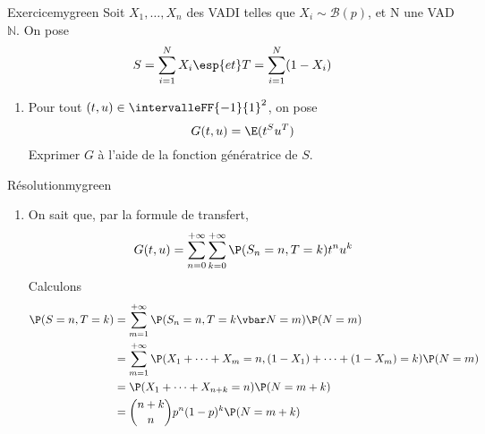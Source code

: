    \begin{omed}{Exercice}{mygreen}
        Soit $X_1,\ldots,X_n$ des VADI telles que $X_i \sim \mathcal{B}(p)$, et N une VAD$\mathbb{N}$. On pose 
        \[ S = \sum_{i=1}^{N} X_i \esp{et} T = \sum_{i=1}^{N} (1 - X_i) \]   
        \begin{enumerate}[label = (\alph*)]
            \item Pour tout $(t,u) \in \intervalleFF{-1}{1}^2$, on pose 
            \[ G(t,u) = \E(t^S u^T) \]   
            Exprimer $G$ à l’aide de la fonction génératrice de $S$.
        \end{enumerate}
    \end{omed}

    \begin{demo}{Résolution}{mygreen}
        \begin{enumerate}[label = (\alph*)]
            \item On sait que, par la formule de transfert, 
            \[ G(t,u) = \sum_{n=0}^{+\infty} \sum_{k=0}^{+\infty} \P(S_n = n, T = k) t^n u^k \]   
            Calculons
            \begin{align*}
                \P(S = n, T = k) 
                &= \sum_{m=1}^{+\infty} \P(S_n = n, T = k \vbar N = m) \P(N = m) \\
                &= \sum_{m=1}^{+\infty} \P(X_1 + \cdots + X_m = n, (1- X_1) + \cdots + (1 - X_m) = k) \P(N = m) \\
                &= \P(X_1 + \cdots + X_{n + k} = n) \P(N = m + k) \\
                &= \binom{n+k}{n} p^n (1 - p)^k \P(N = m + k)
            \end{align*} 
        \end{enumerate}
    \end{demo}
















